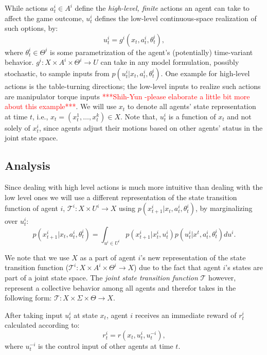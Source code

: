 \documentclass[letterpaper, 10 pt, conference]{ieeeconf}  %
\begin{document}
While actions $a_t^i \in A^i$ define the \textit{high-level, finite} actions an 
agent can take to affect the game outcome, $u_t^i$ defines the low-level continuous-space
realization of such options, by:
\begin{equation}\label{eq:g_function}
  u_t^i = g^i(x_t, a^i_t, \theta^i_t),
\end{equation}
where $\theta^i_t \in \Theta^i$ is some parametrization of the agent's (potentially) time-variant behavior.
$g^i:X \times A^i \times \Theta^i \rightarrow U$ can take in any model 
formulation, possibly stochastic, to sample inputs from $p(u_t^i|x_t,a^i_t,\theta_t^i)$. 
One example for high-level actions is the table-turning directions; the low-level inputs to realize such actions are manipulator torque inputs \textcolor{red}{***Shih-Yun -please elaborate a little bit more about this example***}. We will use $x_t$ to denote all agents' state representation at time $t$, i.e., $x_t = (x^1_t,\ldots,x^k_t) \in X$. Note that, $u_t^i$ is a function of $x_t$ and not solely of $x^i_t$, since agents adjust their motions based on other agents' status in the joint state space. 

\subsection{Analysis}
Since dealing with high level actions is much more intuitive than dealing with the low level ones we will use a different representation of the state transition function of agent $i$, $\mathcal{T}^i:X \times U^i \rightarrow X$ using $p(x^i_{t+1}|x_t,a^i_t,\theta^i_t)$, by marginalizing over $u^i_t$:
\begin{equation}
  p(x^i_{t+1}|x_t,a^i_t,\theta^i_t) = \int_{u^i \in U^i} 
  p(x_{t+1}^i|x^i_t,u^i_t) p(u^i_t|x^t,a^i_t,\theta^i_t)du^i.
\end{equation}

We note that we use $X$ as a part of agent $i$'s new representation of the state transition function ($\mathcal{T}^i:X \times A^i \times \Theta^i \rightarrow X$) due to the fact that agent $i$'s states are part of a joint state space. The \textit{joint state transition function} $\mathcal{T}$ however, represent a collective behavior among all agents and therefor takes in the following form: $\mathcal{T}:X \times \Sigma \times \Theta \rightarrow X$. 

After taking input $u_t^i$ at state $x_t$, agent $i$ receives an immediate reward of $r^i_t$ calculated according to: 
\begin{equation}\label{eq:r_control_input}
  r^i_t = r(x_t,u^i_t,u^{-i}_t),
\end{equation}
where $u^{-i}_t$ is the control input of other agents at time $t$. 
\end{document}
